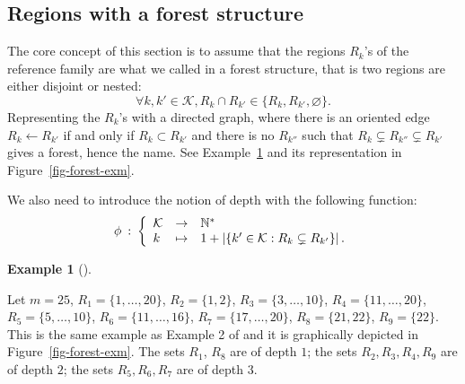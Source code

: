 \documentclass[
  11pt,
  a4paper,
]{article}
\theoremstyle{plain}
\theoremstyle{plain}
\theoremstyle{plain}
\theoremstyle{definition}
\theoremstyle{definition}
\newtheorem{example}{Example}[section]
\theoremstyle{remark}
\begin{document}
\subsection{Regions with a forest structure}\label{sec-forest-structure}

The core concept of this section is to assume that the regions \(R_k\)'s
of the reference family are what we called in \citet{MR4178188} a forest
structure, that is two regions are either disjoint or nested:
\begin{equation}
\forall k,k'\in\mathcal{K} , R_k \cap R_{k'} \in \{ R_k,  R_{k'} , \varnothing \}.
\label{eq-forest}
\end{equation} Representing the \(R_k\)'s with a directed graph, where
there is an oriented edge \(R_k \leftarrow R_{k'}\) if and only if
\(R_k \subset R_{k'}\) and there is no \(R_{k''}\) such that
\(R_k \subsetneq R_{k''}\subsetneq R_{k'}\) gives a forest, hence the
name. See Example~\ref{exm-toy-forest} and its representation in
Figure~\ref{fig-forest-exm}.

We also need to introduce the notion of depth with the following
function: \begin{equation}
\phi \:  : \: \left\{
\begin{array}{l  c l  }
 \mathcal{K}& \to & \mathbb{N}^*\\
k & \mapsto & 1 + \left| \{k'\in\mathcal{K}: R_k\subsetneq R_{k'} \} \right|   .
\end{array}
\right.
\label{eq-depth}
\end{equation}

\begin{example}[]\protect\hypertarget{exm-toy-forest}{}\label{exm-toy-forest}

Let \(m=25\), \(R_1 = \{1, \dotsc , 20 \}\), \(R_2  =  \{1, 2  \}\),
\(R_3   =   \{3 , \dotsc , 10 \}\), \(R_4  =    \{11, \dotsc , 20 \}\),
\(R_5 =  \{5, \dotsc , 10 \}\), \(R_6   =     \{11, \dotsc , 16 \}\),
\(R_7  =   \{17, \dotsc ,20  \}\), \(R_8=\{21,22\}\), \(R_9 = \{22\}\).
This is the same example as Example 2 of \citet{MR4178188} and it is
graphically depicted in Figure~\ref{fig-forest-exm}. The sets \(R_1\),
\(R_8\) are of depth \(1\); the sets \(R_2,R_3,R_4,R_9\) are of depth
\(2\); the sets \(R_5,R_6,R_7\) are of depth \(3\).

\end{example}
\end{document}
